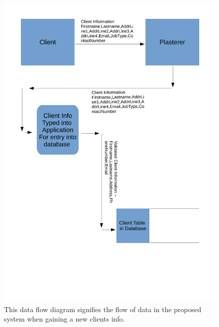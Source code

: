 \begin{figure}[H]
\includegraphics[width=\textwidth]{./Analysis/images/proposedSystemGainingClientInfo.pdf}
    \caption{This data flow diagram signifies the flow of data in the proposed system when gaining a new clients info.} \label{fig:proposed_system_dfd_1}
\end{figure}


